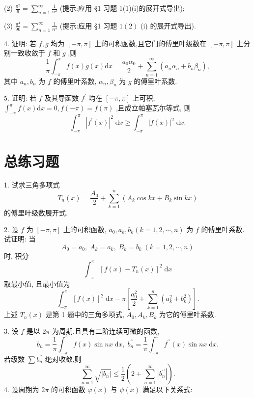 (2) \(\frac{{\pi }^{2}}{6} = \mathop{\sum }\limits_{{n = 1}}^{\infty }\frac{1}{{n}^{2}}\) (提示:应用 §1 习题 1(1)(i)的展开式导出);



(3) \(\frac{{\pi }^{4}}{90} = \mathop{\sum }\limits_{{n = 1}}^{\infty }\frac{1}{{n}^{4}}\) (提示:应用 §1 习题 \(1\left( 2\right)\) (i) 的展开式导出).

4. 证明: 若 \(f,g\) 均为 \(\left\lbrack  {-\pi ,\pi }\right\rbrack\) 上的可积函数,且它们的傅里叶级数在 \(\left\lbrack  {-\pi ,\pi }\right\rbrack\) 上分别一致收敛于 \(f\) 和 \(g\) ,则
\[
\frac{1}{\pi }{\int }_{-\pi }^{\pi }f\left( x\right) g\left( x\right) \mathrm{d}x = \frac{{a}_{0}{\alpha }_{0}}{2} + \mathop{\sum }\limits_{{n = 1}}^{\infty }\left( {{a}_{n}{\alpha }_{n} + {b}_{n}{\beta }_{n}}\right) ,
\]
其中 \({a}_{n},{b}_{n}\) 为 \(f\) 的傅里叶系数, \({\alpha }_{n},{\beta }_{n}\) 为 \(g\) 的傅里叶系数.

5. 证明: 若 \(f\) 及其导函数 \({f}^{\prime }\) 均在 \(\left\lbrack  {-\pi ,\pi }\right\rbrack\) 上可积, \({\int }_{-\pi }^{\pi }f\left( x\right) \mathrm{d}x = 0,f\left( {-\pi }\right)  = f\left( \pi \right)\) ,且成立帕塞瓦尔等式, 则
\[
{\int }_{-\pi }^{\pi }{\left| {f}^{\prime }\left( x\right) \right| }^{2}\mathrm{\;d}x \geq  {\int }_{-\pi }^{\pi }{\left| f\left( x\right) \right| }^{2}\mathrm{\;d}x.
\]
\section{总练习题}

1. 试求三角多项式
\[
{T}_{n}\left( x\right)  = \frac{{A}_{0}}{2} + \mathop{\sum }\limits_{{k = 1}}^{n}\left( {{A}_{k}\cos {kx} + {B}_{k}\sin {kx}}\right)
\]
的傅里叶级数展开式.

2. 设 \(f\) 为 \(\left\lbrack  {-\pi ,\pi }\right\rbrack\) 上的可积函数, \({a}_{0},{a}_{k},{b}_{k}\left( {k = 1,2,\cdots ,n}\right)\) 为 \(f\) 的傅里叶系数. 试证明: 当
\[
{A}_{0} = {a}_{0},\;{A}_{k} = {a}_{k},\;{B}_{k} = {b}_{k}\;\left( {k = 1,2,\cdots ,n}\right)
\]
时, 积分
\[
{\int }_{-\pi }^{\pi }{\left\lbrack  f\left( x\right)  - {T}_{n}\left( x\right) \right\rbrack  }^{2}\mathrm{\;d}x
\]
取最小值, 且最小值为
\[
{\int }_{-\pi }^{\pi }{\left\lbrack  f\left( x\right) \right\rbrack  }^{2}\mathrm{\;d}x - \pi \left\lbrack  {\frac{{a}_{0}^{2}}{2} + \mathop{\sum }\limits_{{k = 1}}^{n}\left( {{a}_{k}^{2} + {b}_{k}^{2}}\right) }\right\rbrack  .
\]
上述 \({T}_{n}\left( x\right)\) 是第 1 题中的三角多项式, \({A}_{0},{A}_{k},{B}_{k}\) 为它的傅里叶系数.

3. 设 \(f\) 是以 \({2\pi }\) 为周期,且具有二阶连续可微的函数,
\[
{b}_{n} = \frac{1}{\pi }{\int }_{-\pi }^{\pi }f\left( x\right) \sin {nx}\mathrm{\;d}x,\;{b}_{n}^{\prime \prime } = \frac{1}{\pi }{\int }_{-\pi }^{\pi }{f}^{\prime \prime }\left( x\right) \sin {nx}\mathrm{\;d}x.
\]
若级数 \(\sum {b}_{n}^{\prime \prime }\) 绝对收敛,则
\[
\mathop{\sum }\limits_{{n = 1}}^{\infty }\sqrt{\left| {b}_{n}\right| } \leq  \frac{1}{2}\left( {2 + \mathop{\sum }\limits_{{n = 1}}^{\infty }\left| {b}_{n}^{\prime \prime }\right| }\right) .
\]
4. 设周期为 \({2\pi }\) 的可积函数 \(\varphi \left( x\right)\) 与 \(\psi \left( x\right)\) 满足以下关系式:

